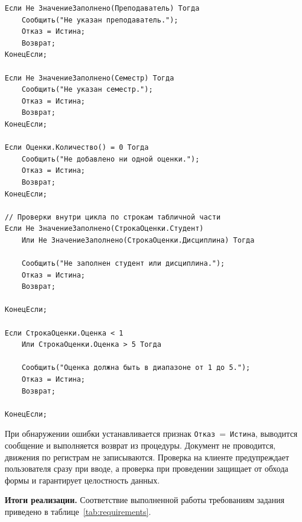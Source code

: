 \documentclass[14pt,a4paper]{extarticle}
\begin{document}
{\small
\begin{verbatim}
Если Не ЗначениеЗаполнено(Преподаватель) Тогда
    Сообщить("Не указан преподаватель.");
    Отказ = Истина;
    Возврат;
КонецЕсли;

Если Не ЗначениеЗаполнено(Семестр) Тогда
    Сообщить("Не указан семестр.");
    Отказ = Истина;
    Возврат;
КонецЕсли;

Если Оценки.Количество() = 0 Тогда
    Сообщить("Не добавлено ни одной оценки.");
    Отказ = Истина;
    Возврат;
КонецЕсли;

// Проверки внутри цикла по строкам табличной части
Если Не ЗначениеЗаполнено(СтрокаОценки.Студент)
    Или Не ЗначениеЗаполнено(СтрокаОценки.Дисциплина) Тогда

    Сообщить("Не заполнен студент или дисциплина.");
    Отказ = Истина;
    Возврат;

КонецЕсли;

Если СтрокаОценки.Оценка < 1
    Или СтрокаОценки.Оценка > 5 Тогда

    Сообщить("Оценка должна быть в диапазоне от 1 до 5.");
    Отказ = Истина;
    Возврат;

КонецЕсли;
\end{verbatim}
}

При обнаружении ошибки устанавливается признак \texttt{Отказ}~=~\texttt{Истина},
выводится сообщение и выполняется возврат из процедуры. Документ не проводится,
движения по регистрам не записываются. Проверка на клиенте предупреждает
пользователя сразу при вводе, а проверка при проведении защищает от обхода
формы и гарантирует целостность данных.

\noindent\textbf{Итоги реализации.}
Соответствие выполненной работы требованиям задания приведено в
таблице~\ref{tab:requirements}.
\end{document}
